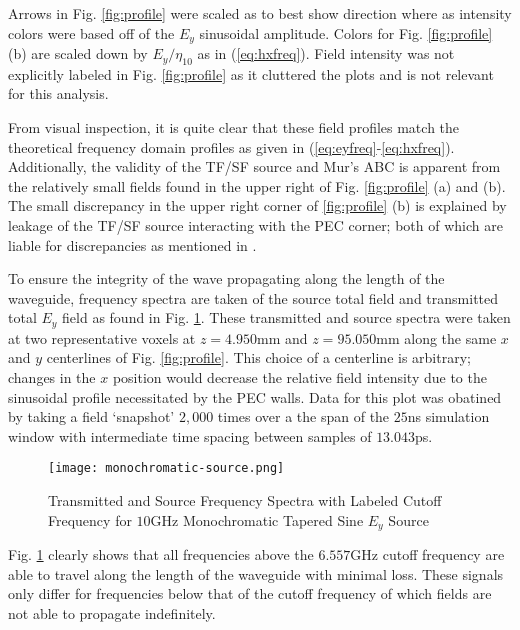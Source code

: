 Arrows in Fig. \ref{fig:profile} were scaled as to best show direction where as intensity colors were based off of the $E_y$ sinusoidal amplitude. Colors for Fig. \ref{fig:profile} (b) are scaled down by $E_y / \eta_{10}$ as in (\ref{eq:hxfreq}). Field intensity was not explicitly labeled in Fig. \ref{fig:profile} as it cluttered the plots and is not relevant for this analysis. 

From visual inspection, it is quite clear that these field profiles match the theoretical frequency domain profiles as given in (\ref{eq:eyfreq}-\ref{eq:hxfreq}). Additionally, the validity of the TF/SF source and Mur's ABC is apparent from the relatively small fields found in the upper right of Fig. \ref{fig:profile} (a) and (b). The small discrepancy in the upper right corner of \ref{fig:profile} (b) is explained by leakage of the TF/SF source interacting with the PEC corner; both of which are liable for discrepancies as mentioned in \cite{rothlecnotes}.

To ensure the integrity of the wave propagating along the length of the waveguide, frequency spectra are taken of the source total field and transmitted total $E_y$ field as found in Fig. \ref{fig:mono-spectra}. These transmitted and source spectra were taken at two representative voxels at $z=4.950$mm and $z=95.050$mm along the same $x$ and $y$ centerlines of Fig. \ref{fig:profile}. This choice of a centerline is arbitrary; changes in the $x$ position would decrease the relative field intensity due to the sinusoidal profile necessitated by the PEC walls. Data for this plot was obatined by taking a field `snapshot' $2,000$ times over a the span of the $25$ns simulation window with intermediate time spacing between samples of $13.043$ps.
\begin{figure}[h!]  
	\centering
	\texttt{[image: monochromatic-source.png]} 
	\caption{Transmitted and Source Frequency Spectra with Labeled Cutoff Frequency for $10$GHz Monochromatic Tapered Sine $E_y$ Source}
	\label{fig:mono-spectra}
\end{figure}

Fig. \ref{fig:mono-spectra} clearly shows that all frequencies above the $6.557$GHz cutoff frequency are able to travel along the length of the waveguide with minimal loss. These signals only differ for frequencies below that of the cutoff frequency of which fields are not able to propagate indefinitely.

